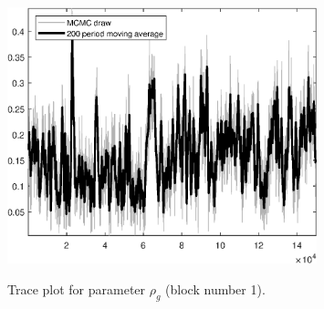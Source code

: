 \begin{figure}[H]
\centering
  \includegraphics[width=0.8\textwidth]{BRS_gen/graphs/TracePlot_rho_g_blck_1}\\
    \caption{Trace plot for parameter ${\rho_g}$ (block number 1).}
\end{figure}
